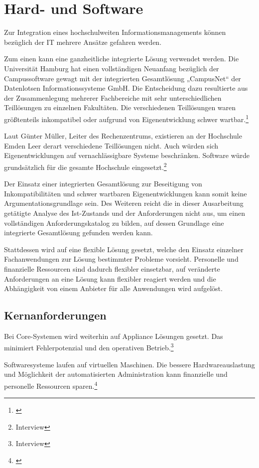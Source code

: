 \section{Hard- und Software}
Zur Integration eines hochschulweiten Informationsmanagements können bezüglich der IT mehrere Ansätze gefahren werden.

Zum einen kann eine ganzheitliche integrierte Lösung verwendet werden. Die Universität Hamburg hat einen vollständigen Neuanfang bezüglich der Campussoftware gewagt mit der integrierten Gesamtlösung „CampusNet“ der Datenlotsen Informationssysteme GmbH. Die Entscheidung dazu resultierte aus der Zusammenlegung mehrerer Fachbereiche mit sehr unterschiedlichen Teillösungen zu einzelnen Fakultäten. Die verschiedenen Teillösungen waren größtenteils inkompatibel oder aufgrund von Eigenentwicklung schwer wartbar.\footnote{\cite{dini_webportale_2007}}

Laut Günter Müller, Leiter des Rechenzentrums, existieren an der Hochschule Emden Leer derart verschiedene Teillösungen nicht. Auch würden sich Eigenentwicklungen auf vernachlässigbare Systeme beschränken. Software würde grundsätzlich für die gesamte Hochschule eingesetzt.\footnote{Interview}

Der Einsatz einer integrierten Gesamtlösung zur Beseitigung von Inkompatibilitäten und schwer wartbaren Eigenentwicklungen kann somit keine Argumentationsgrundlage sein.
Des Weiteren reicht die in dieser Ausarbeitung getätigte Analyse des Ist-Zustands und der Anforderungen nicht aus, um einen vollständigen Anforderungskatalog zu bilden, auf dessen Grundlage eine integrierte Gesamtlösung gefunden werden kann.

Stattdessen wird auf eine flexible Lösung gesetzt, welche den Einsatz einzelner Fachanwendungen zur Lösung bestimmter Probleme vorsieht. Personelle und finanzielle Ressourcen sind dadurch flexibler einsetzbar, auf veränderte Anforderungen an eine Lösung kann flexibler reagiert werden und die Abhängigkeit von einem Anbieter für alle Anwendungen wird aufgelöst.

\subsection{Kernanforderungen}
Bei Core-Systemen wird weiterhin auf Appliance Lösungen gesetzt. Das minimiert Fehlerpotenzial und den operativen Betrieb.\footnote{Interview}

Softwaresysteme laufen auf virtuellen Maschinen. Die bessere Hardwareauslastung und Möglichkeit der automatisierten Administration kann finanzielle und personelle Ressourcen sparen.\footnote{\cite{baun_servervirtualisierung_2009}}

